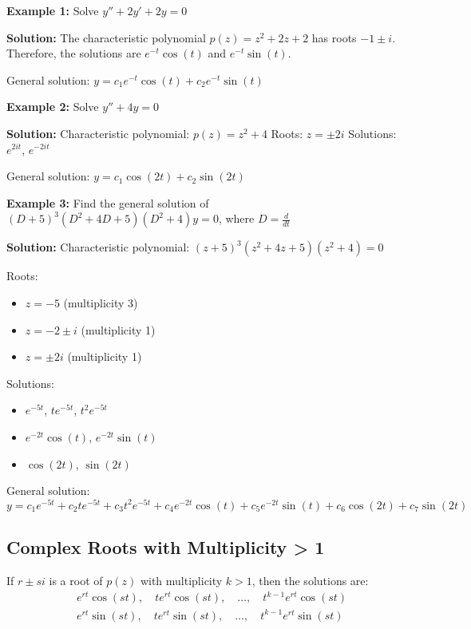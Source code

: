 \documentclass{article}
\begin{document}
\textbf{Example 1:} Solve $y'' + 2y' + 2y = 0$

\textbf{Solution:} 
The characteristic polynomial $p(z) = z^2 + 2z + 2$ has roots $-1 \pm i$.
Therefore, the solutions are $e^{-t}\cos(t)$ and $e^{-t}\sin(t)$.

General solution: $y = c_1e^{-t}\cos(t) + c_2e^{-t}\sin(t)$

\textbf{Example 2:} Solve $y''+4y=0$

\textbf{Solution:} 
Characteristic polynomial: $p(z) = z^2 + 4$
Roots: $z = \pm 2i$
Solutions: $e^{2it}$, $e^{-2it}$

General solution: $y = c_1\cos(2t) + c_2\sin(2t)$

\textbf{Example 3:} Find the general solution of $(D+5)^3(D^2+4D+5)(D^2+4)y = 0$, where $D = \frac{d}{dt}$

\textbf{Solution:}
Characteristic polynomial: $(z+5)^3(z^2+4z+5)(z^2+4) = 0$

Roots:
\begin{itemize}
    \item $z = -5$ (multiplicity 3)
    \item $z = -2 \pm i$ (multiplicity 1)
    \item $z = \pm 2i$ (multiplicity 1)
\end{itemize}

Solutions:
\begin{itemize}
    \item $e^{-5t}$, $te^{-5t}$, $t^2e^{-5t}$
    \item $e^{-2t}\cos(t)$, $e^{-2t}\sin(t)$
    \item $\cos(2t)$, $\sin(2t)$
\end{itemize}

General solution:
\[
y = c_1e^{-5t} + c_2te^{-5t} + c_3t^2e^{-5t} + c_4e^{-2t}\cos(t) + c_5e^{-2t}\sin(t) + c_6\cos(2t) + c_7\sin(2t)
\]

\subsection*{Complex Roots with Multiplicity > 1}

If $r \pm si$ is a root of $p(z)$ with multiplicity $k > 1$, then the solutions are:
\[
\begin{aligned}
&e^{rt}\cos(st), \quad te^{rt}\cos(st), \quad \ldots, \quad t^{k-1}e^{rt}\cos(st) \\
&e^{rt}\sin(st), \quad te^{rt}\sin(st), \quad \ldots, \quad t^{k-1}e^{rt}\sin(st)
\end{aligned}
\]
\end{document}
